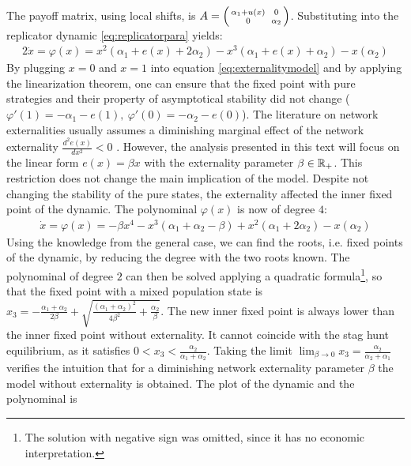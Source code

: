 The payoff matrix, using local shifts, is 
$A=\begin{psmallmatrix}\alpha_1+u(x) && 0 \\ 0&& \alpha_2\end{psmallmatrix}$. 
Substituting into the replicator dynamic  \eqref{eq:replicatorpara} yields:
\begin{alignat}{2}
        \dot{x} = \varphi(x) = x^2(\alpha_1+e(x) +2\alpha_2 ) 
        - x^3(\alpha_1+e(x)+\alpha_2) - x(\alpha_2)
        \label{eq:externalitymodel}
\end{alignat}
By plugging $x=0$ and $x=1$ into equation \eqref{eq:externalitymodel} and 
by applying the linearization theorem, one can ensure 
that the fixed point with pure strategies and their
property of asymptotical stability did not change
($\varphi'(1) = -\alpha_1 -e(1),\ \varphi'(0) = -\alpha_2 -e(0)$).
The literature on network externalities usually assumes a diminishing
marginal effect of the network externality $\frac{d^2e(x)}{dx^2} <0$ 
\parencite[73]{lin_impact_2008}. However, the analysis presented in this text
will focus on the linear form $e(x) = \beta x$ with the externality parameter
$\beta \in \mathbb{R}_+$. This restriction does not change the main implication
of the model. 
Despite not changing the stability of the pure states, 
the externality affected the inner fixed point of the dynamic.
The polynominal $\varphi(x)$ is now of degree $4$:
\begin{align}
        \dot{x} = \varphi(x) = -\beta x^4 -x^3(\alpha_1 + \alpha_2 
        - \beta ) + x^2 (\alpha_1 + 2 \alpha_2) - x(\alpha_2)
\end{align}
Using the knowledge from the general case, we can find the roots, i.e. fixed
points of the dynamic, by reducing the degree with the two roots known. The
polynominal of degree $2$ can then be solved applying a quadratic formula\footnote{
The solution with negative sign was omitted, since it has no economic 
interpretation.}, so that the fixed point with a mixed population state is
$x_3 = -\frac{\alpha_1+\alpha_2}{2 \beta} + 
\sqrt{\frac{(\alpha_1+\alpha_2)^2}{4\beta^2} +\frac{\alpha_2}{\beta}}$. 
The new inner fixed point is always lower than the inner fixed point without 
externality. It cannot coincide with the stag hunt equilibrium, as it 
satisfies $0<x_3<\frac{\alpha_2}{\alpha_1+\alpha_2}$. 
Taking the limit $\lim_{\beta \rightarrow 0} x_3 = 
\frac{\alpha_2}{\alpha_2+\alpha_1}$ verifies the intuition that for a 
diminishing network externality parameter $\beta$ the model without 
externality is obtained.
The plot of the dynamic and the polynominal is 
